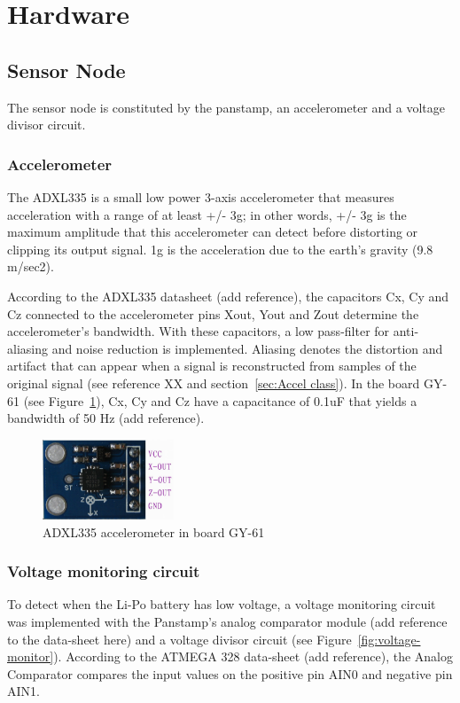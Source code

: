 \section{Hardware}
\subsection{Sensor Node}
The sensor node is constituted by the panstamp, an accelerometer and a voltage divisor circuit.

\subsubsection{Accelerometer}
\label{sec:Accelerometer}
The ADXL335 is a small low power 3-axis accelerometer that measures acceleration with a range of at least +/- 3g; in other words, +/- 3g is the maximum amplitude that this accelerometer can detect before distorting or clipping its output signal. 1g is the acceleration due to the earth's gravity (9.8 m/sec2).

According to the ADXL335 datasheet (add reference), the capacitors Cx, Cy and Cz connected to the accelerometer pins Xout, Yout and Zout determine the accelerometer's bandwidth. With these capacitors, a low pass-filter for anti-aliasing and noise reduction is implemented. Aliasing denotes the distortion and artifact that can appear when a signal is reconstructed from samples of the original signal (see reference XX and section~\ref{sec:Accel class}). In the board GY-61 (see Figure~\ref{fig:accelerometer}), Cx, Cy and Cz have a capacitance of 0.1uF that yields a bandwidth of 50 Hz (add reference). 	

\begin{figure}[h!] 
 \centering
 \includegraphics[width= 0.35\textwidth, clip=true,keepaspectratio=true]
 {./pic/accelerometer.png}
 \caption{ADXL335 accelerometer in board GY-61}
 \label{fig:accelerometer}
\end{figure}  
    
  
\subsubsection{Voltage monitoring circuit}
\label{sec:Voltage monitoring circuit}
To detect when the Li-Po battery has low voltage, a voltage monitoring circuit was implemented with the Panstamp's analog comparator module (add reference to the data-sheet here) and a voltage divisor circuit (see Figure~\ref{fig:voltage-monitor}). According to the ATMEGA 328 data-sheet (add reference), the Analog Comparator compares the input values on the positive pin AIN0 and negative pin AIN1. 

